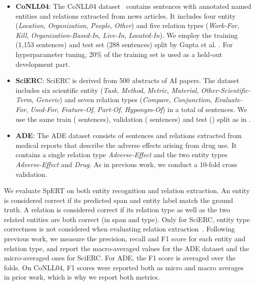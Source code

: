 \documentclass{ecai}
\begin{document}
\begin{itemize}
    \item \textbf{CoNLL04}: The CoNLL04 dataset~\cite{roth:2004:conll04} contains sentences with annotated named entities and relations extracted from news articles. It includes four entity (\emph{Location}, \emph{Organization}, \emph{People}, \emph{Other}) and five relation types (\emph{Work-For}, \emph{Kill}, \emph{Organization-Based-In}, \emph{Live-In}, \emph{Located-In}). We employ the training (1,153 sentences) and test set (288 sentences) split by Gupta et al. \cite{gupta:2016:table_filling}. For hyperparameter tuning, 20\% of the training set is used as a held-out development part. 
    \item \textbf{SciERC}: SciERC \cite{luan:2018:scierc} is derived from 500 abstracts of AI papers. The dataset includes six scientific entity (\emph{Task}, \emph{Method}, \emph{Metric}, \emph{Material}, \emph{Other-Scientific-Term}, \emph{Generic}) and seven relation types (\emph{Compare}, \emph{Conjunction}, \emph{Evaluate-For}, \emph{Used-For}, \emph{Feature-Of}, \emph{Part-Of}, \emph{Hyponym-Of}) in a total of  sentences. We use the same train ( sentences), validation ( sentences) and test () split as in \cite{luan:2018:scierc}.
    \item \textbf{ADE}: The ADE dataset \cite{gurulingappa:2012:ade} consists of  sentences and  relations extracted from medical reports that describe the adverse effects arising from drug use. It contains a single relation type \emph{Adverse-Effect} and the two entity types \emph{Adverse-Effect} and \emph{Drug}. As in previous work, we conduct a 10-fold cross validation. \end{itemize}

We evaluate SpERT on both entity recognition and relation extraction. An entity is considered correct if its predicted span and entity label match the ground truth. A relation is considered correct if its relation type as well as the two related entities are both correct (in span and type). Only for SciERC, entity type correctness is not considered when evaluating relation extraction~\cite{luan:2018:scierc}. Following previous work, we measure the precision, recall and F1 score for each entity and relation type, and report the macro-averaged values for the ADE dataset and the micro-averaged ones for SciERC. For ADE, the F1 score is averaged over the folds. On CoNLL04, F1 scores were reported both as micro and macro averages in prior work, which is why we report both metrics.
\end{document}
